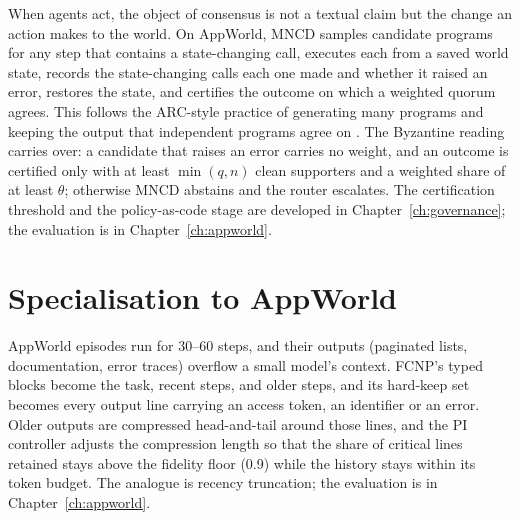 When agents act, the object of consensus is not a textual claim but the change an action makes to the
world. On AppWorld, MNCD samples candidate programs for any step that contains a state-changing call,
executes each from a saved world state, records the state-changing calls each one made and whether it
raised an error, restores the state, and certifies the outcome on which a weighted quorum agrees. This
follows the ARC-style practice of generating many programs and keeping the output that independent
programs agree on \citep{chollet2019measure}. The Byzantine reading carries over: a candidate that
raises an error carries no weight, and an outcome is certified only with at least $\min(q,n)$ clean
supporters and a weighted share of at least $\theta$; otherwise MNCD abstains and the router escalates.
The certification threshold and the policy-as-code stage are developed in Chapter~\ref{ch:governance};
the evaluation is in Chapter~\ref{ch:appworld}.

\section{Specialisation to AppWorld}
\label{sec:fcnp-appworld}

AppWorld episodes run for 30--60 steps, and their outputs (paginated lists, documentation, error
traces) overflow a small model's context. FCNP's typed blocks become the task, recent steps, and older
steps, and its hard-keep set becomes every output line carrying an access token, an identifier or an
error. Older outputs are compressed head-and-tail around those lines, and the PI controller adjusts the
compression length so that the share of critical lines retained stays above the fidelity floor (0.9)
while the history stays within its token budget. The analogue is recency truncation; the evaluation is
in Chapter~\ref{ch:appworld}.
